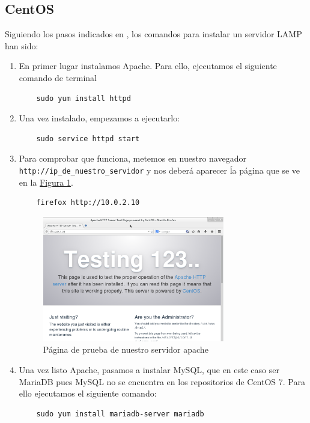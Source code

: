 \documentclass[10pt,a4paper,spanish]{article}
\numberwithin{equation}{section} %
\numberwithin{figure}{section} %
\numberwithin{table}{section} %
\begin{document}
\subsection{CentOS}
Siguiendo los pasos indicados en \cite{digocean2}, los comandos para instalar un servidor LAMP han sido:
\begin{enumerate}[1.]
    \item En primer lugar instalamos Apache. Para ello, ejecutamos el siguiente comando de terminal
    \begin{verbatim}
    sudo yum install httpd
    \end{verbatim}

    \item Una vez instalado, empezamos a ejecutarlo:
    \begin{verbatim}
    sudo service httpd start
    \end{verbatim}

    \item Para comprobar que funciona, metemos en nuestro navegador \texttt{http://ip\_de\_nuestro\_servidor} y nos deberá aparecer ĺa página que se ve en la \hyperref[apacheok]{Figura \ref*{apacheok}}.
    \begin{verbatim}
    firefox http://10.0.2.10
    \end{verbatim}

    \begin{figure}[!h]
        \centering
        \includegraphics[width=0.75\textwidth]{18}
        \caption{Página de prueba de nuestro servidor apache}
        \label{apacheok}
    \end{figure}

    \item Una vez listo Apache, pasamos a instalar MySQL, que en este caso ser MariaDB pues MySQL no se encuentra en los repositorios de CentOS 7. Para ello ejecutamos el siguiente comando:
    \begin{verbatim}
    sudo yum install mariadb-server mariadb
    \end{verbatim}


\end{enumerate}
\end{document}
